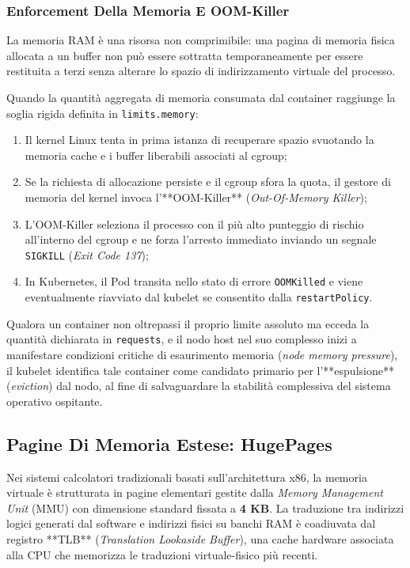 \documentclass[11pt, a4paper]{article}
\begin{document}
\subsubsection{Enforcement Della Memoria E OOM-Killer}
La memoria RAM è una risorsa non comprimibile: una pagina di memoria fisica allocata a un buffer non può essere sottratta temporaneamente per essere restituita a terzi senza alterare lo spazio di indirizzamento virtuale del processo.

Quando la quantità aggregata di memoria consumata dal container raggiunge la soglia rigida definita in \texttt{limits.memory}:
\begin{enumerate}[noitemsep]
    \item Il kernel Linux tenta in prima istanza di recuperare spazio svuotando la memoria cache e i buffer liberabili associati al cgroup;
    \item Se la richiesta di allocazione persiste e il cgroup sfora la quota, il gestore di memoria del kernel invoca l'**OOM-Killer** (\emph{Out-Of-Memory Killer});
    \item L'OOM-Killer seleziona il processo con il più alto punteggio di rischio all'interno del cgroup e ne forza l'arresto immediato inviando un segnale \texttt{SIGKILL} (\emph{Exit Code 137});
    \item In Kubernetes, il Pod transita nello stato di errore \texttt{OOMKilled} e viene eventualmente riavviato dal kubelet se consentito dalla \texttt{restartPolicy}.
\end{enumerate}

Qualora un container non oltrepassi il proprio limite assoluto ma ecceda la quantità dichiarata in \texttt{requests}, e il nodo host nel suo complesso inizi a manifestare condizioni critiche di esaurimento memoria (\emph{node memory pressure}), il kubelet identifica tale container come candidato primario per l'**espulsione** (\emph{eviction}) dal nodo, al fine di salvaguardare la stabilità complessiva del sistema operativo ospitante.

\subsection{Pagine Di Memoria Estese: HugePages}

Nei sistemi calcolatori tradizionali basati sull'architettura x86, la memoria virtuale è strutturata in pagine elementari gestite dalla \emph{Memory Management Unit} (MMU) con dimensione standard fissata a \textbf{4 KB}. La traduzione tra indirizzi logici generati dal software e indirizzi fisici su banchi RAM è coadiuvata dal registro **TLB** (\emph{Translation Lookaside Buffer}), una cache hardware associata alla CPU che memorizza le traduzioni virtuale-fisico più recenti.
\end{document}
